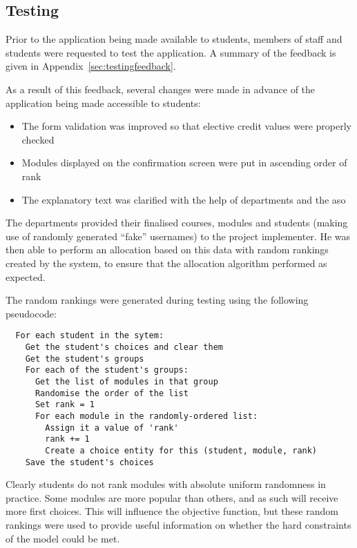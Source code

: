 
\subsection{Testing}



Prior to the application being made available to students, members of staff
and students were requested to test the application. A summary of the feedback
is given in Appendix~\ref{sec:testingfeedback}.

As a result of this feedback, several changes were made in advance of the
application being made accessible to students:

\begin{itemize}
  \item The form validation was improved so that elective credit values were properly checked
  \item Modules displayed on the confirmation screen were put in ascending order of rank
  \item The explanatory text was clarified with the help of departments and the \gls{aso}
\end{itemize}


The departments provided their finalised courses, modules and students (making
use of randomly generated ``fake'' usernames) to the project implementer. He
was then able to perform an allocation based on this data with random rankings
created by the system, to ensure that the allocation algorithm performed as
expected.

The random rankings were generated during testing using the following
pseudocode:

\begin{verbatim}
  For each student in the sytem:
    Get the student's choices and clear them
    Get the student's groups
    For each of the student's groups:
      Get the list of modules in that group
      Randomise the order of the list
      Set rank = 1
      For each module in the randomly-ordered list:
        Assign it a value of 'rank'
        rank += 1
        Create a choice entity for this (student, module, rank)
    Save the student's choices
\end{verbatim}

Clearly students do not rank modules with absolute uniform randomness in
practice. Some modules are more popular than others, and as such will receive
more first choices. This will influence the objective function, but these
random rankings were used to provide useful information on whether the hard
constraints of the model could be met.


